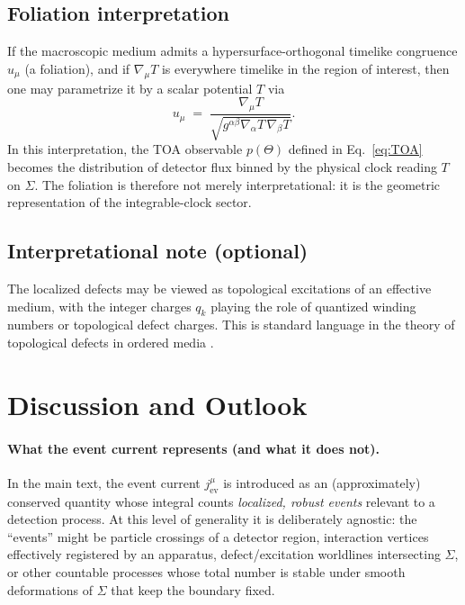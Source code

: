 \documentclass[pdflatex,sn-mathphys-num]{sn-jnl}
\theoremstyle{thmstylethree}
\theoremstyle{thmstyleone}
\theoremstyle{thmstyletwo}
\numberwithin{equation}{section}
\begin{document}
    \subsection{Foliation interpretation}
        
        If the macroscopic medium admits a hypersurface-orthogonal timelike congruence $u_\mu$ (a foliation), and if $\nabla_\mu T$ is everywhere timelike in the region of interest, then one may parametrize it by a scalar potential $T$ via
        \begin{equation}
            u_\mu \;=\;\frac{\nabla_\mu T}{\sqrt{g^{\alpha\beta}\nabla_\alpha T\,\nabla_\beta T}}.
            \label{eq:uFromT}
        \end{equation}
        In this interpretation, the TOA observable $p(\Theta)$ defined in Eq.~\eqref{eq:TOA} becomes the distribution of detector flux binned by the physical clock reading $T$ on $\Sigma$. The foliation is therefore not merely interpretational: it is the geometric representation of the integrable-clock sector.
    
    \subsection{Interpretational note (optional)}
        
        The localized defects may be viewed as topological excitations of an effective medium, with the integer charges $q_k$ playing the role of quantized winding numbers or topological defect charges. This is standard language in the theory of topological defects in ordered media \cite{Peskin1995,Weinberg1995}.

    \section{Discussion and Outlook}\label{sec:discussion}
    
    \paragraph{What the event current represents (and what it does not).}
        In the main text, the event current $j^\mu_{\mathrm{ev}}$ is introduced as an (approximately) conserved quantity whose integral counts \emph{localized, robust events} relevant to a detection process. At this level of generality it is deliberately agnostic: the ``events'' might be particle crossings of a detector region, interaction vertices effectively registered by an apparatus, defect/excitation worldlines intersecting $\Sigma$, or other countable processes whose total number is stable under smooth deformations of $\Sigma$ that keep the boundary fixed.
        
\end{document}
